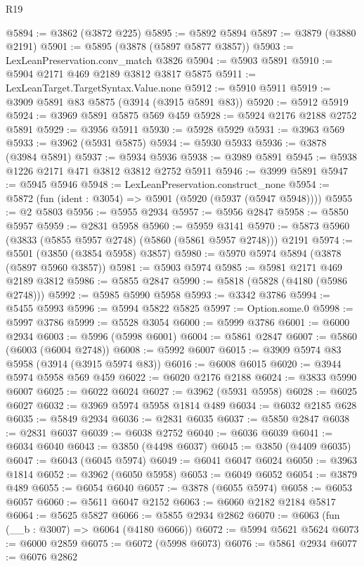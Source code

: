 \begin{lexlean}{R19}
\begin{coremodule}
@5894 := @3862 (@3872 @225)
@5895 := @5892 @5894
@5897 := @3879 (@3880 @2191)
@5901 := @5895 (@3878 (@5897 @5877 @3857))
@5903 := LexLeanPreservation.conv_match @3826
@5904 := @5903 @5891
@5910 := @5904 @2171 @469 @2189 @3812 @3817 @5875
@5911 := LexLeanTarget.TargetSyntax.Value.none
@5912 := @5910 @5911
@5919 := @3909 @5891 @83 @5875 (@3914 (@3915 @5891 @83))
@5920 := @5912 @5919
@5924 := @3969 @5891 @5875 @569 @459
@5928 := @5924 @2176 @2188 @2752 @5891
@5929 := @3956 @5911
@5930 := @5928 @5929
@5931 := @3963 @569
@5933 := @3962 (@5931 @5875)
@5934 := @5930 @5933
@5936 := @3878 (@3984 @5891)
@5937 := @5934 @5936
@5938 := @3989 @5891
@5945 := @5938 @1226 @2171 @471 @3812 @3812 @2752 @5911
@5946 := @3999 @5891
@5947 := @5945 @5946
@5948 := LexLeanPreservation.construct_none
@5954 := @5872 (fun (ident : @3054) => @5901 (@5920 (@5937 (@5947 @5948))))
@5955 := @2 @5803
@5956 := @5955 @2934
@5957 := @5956 @2847
@5958 := @5850 @5957
@5959 := @2831 @5958
@5960 := @5959 @3141
@5970 := @5873 @5960 (@3833 (@5855 @5957 @2748) (@5860 (@5861 @5957 @2748))) @2191
@5974 := @5501 (@3850 (@3854 @5958) @3857)
@5980 := @5970 @5974 @5894 (@3878 (@5897 @5960 @3857))
@5981 := @5903 @5974
@5985 := @5981 @2171 @469 @2189 @3812
@5986 := @5855 @2847
@5990 := @5818 (@5828 (@4180 (@5986 @2748)))
@5992 := @5985 @5990 @5958
@5993 := @3342 @3786
@5994 := @5455 @5993
@5996 := @5994 @5822 @5825
@5997 := Option.some.{0}
@5998 := @5997 @3786
@5999 := @5528 @3054
@6000 := @5999 @3786
@6001 := @6000 @2934
@6003 := @5996 (@5998 @6001)
@6004 := @5861 @2847
@6007 := @5860 (@6003 (@6004 @2748))
@6008 := @5992 @6007
@6015 := @3909 @5974 @83 @5958 (@3914 (@3915 @5974 @83))
@6016 := @6008 @6015
@6020 := @3944 @5974 @5958 @569 @459
@6022 := @6020 @2176 @2188
@6024 := @3833 @5990 @6007
@6025 := @6022 @6024
@6027 := @3962 (@5931 @5958)
@6028 := @6025 @6027
@6032 := @3969 @5974 @5958 @1814 @489
@6034 := @6032 @2185 @628
@6035 := @5849 @2934
@6036 := @2831 @6035
@6037 := @5850 @2847
@6038 := @2831 @6037
@6039 := @6038 @2752
@6040 := @6036 @6039
@6041 := @6034 @6040
@6043 := @3850 (@4498 @6037)
@6045 := @3850 (@4409 @6035)
@6047 := @6043 (@6045 @5974)
@6049 := @6041 @6047 @6024
@6050 := @3963 @1814
@6052 := @3962 (@6050 @5958)
@6053 := @6049 @6052
@6054 := @3879 @489
@6055 := @6054 @6040
@6057 := @3878 (@6055 @5974)
@6058 := @6053 @6057
@6060 := @5611 @6047 @2152
@6063 := @6060 @2182 @2184 @5817
@6064 := @5625 @5827
@6066 := @5855 @2934 @2862
@6070 := @6063 (fun (__b : @3007) => @6064 (@4180 @6066))
@6072 := @5994 @5621 @5624
@6073 := @6000 @2859
@6075 := @6072 (@5998 @6073)
@6076 := @5861 @2934
@6077 := @6076 @2862

\end{coremodule}
\end{lexlean}
